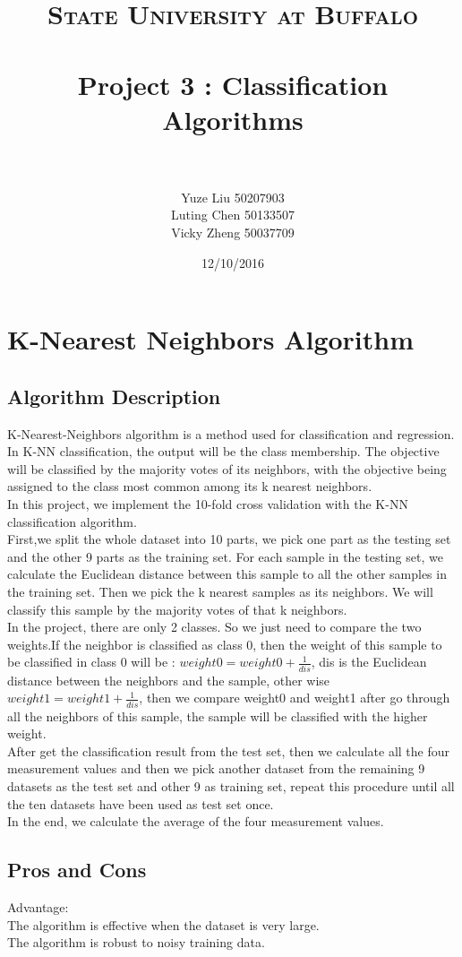 \documentclass[paper=letter, fontsize=11pt]{article}
\title{
		\usefont{OT1}{bch}{b}{n}
		\normalfont \normalsize \textsc{State University at Buffalo} \\ [25pt]
		\horrule{0.5pt} \\[0.4cm]
		\Large Project 3 : Classification Algorithms \\
		\horrule{2pt} \\[0.5cm]
}
\author{
		\normalfont\large 								
        Yuze Liu \hspace{0.6cm}50207903\\
        \normalfont\large 
        Luting Chen \hspace{0.5cm}50133507\\
        \normalfont\large 
        Vicky Zheng \hspace{0.5cm}50037709\\
}
\date{\large 12/10/2016}
\numberwithin{equation}{section}		%
\numberwithin{figure}{section}			%
\numberwithin{table}{section}				%
\begin{document}
\maketitle
\section{K-Nearest Neighbors Algorithm}
\subsection{Algorithm Description}
K-Nearest-Neighbors algorithm is a method used for classification and regression. In K-NN classification, the output will be the class membership. The objective will be classified by the majority votes of its neighbors, with the objective being assigned to the class most common among its k nearest neighbors.\\
In this project, we implement the 10-fold cross validation with the K-NN classification algorithm.\\
First,we split the whole dataset into 10 parts, we pick one part as the testing set and the other 9 parts as the training set. For each sample in the testing set, we calculate the Euclidean distance between this sample to all the other samples in the training set. Then we pick the k nearest samples as its neighbors. We will classify this sample by the majority votes of that k neighbors.\\
In the project, there are only 2 classes. So we just need to compare the two weights.If the neighbor is classified as class 0, then the weight of this sample to be classified in class 0 will be : $weight0 = weight0 + \frac{1}{dis}$, dis is the Euclidean distance between the neighbors and the sample, other wise $weight1 = weight1 + \frac{1}{dis}$, then we compare weight0 and weight1 after go through all the neighbors of this sample, the sample will be classified with the higher weight.\\
After get the classification result from the test set, then we calculate all the four measurement values and then we pick another dataset from the remaining 9 datasets as the test set and other 9 as training set, repeat this procedure until all the ten datasets have been used as test set once.\\
In the end, we calculate the average of the four measurement values.  

\subsection{Pros and Cons}
Advantage:\\
The algorithm is effective when the dataset is very large.\\
The algorithm is robust to noisy training data.\\
\end{document}
